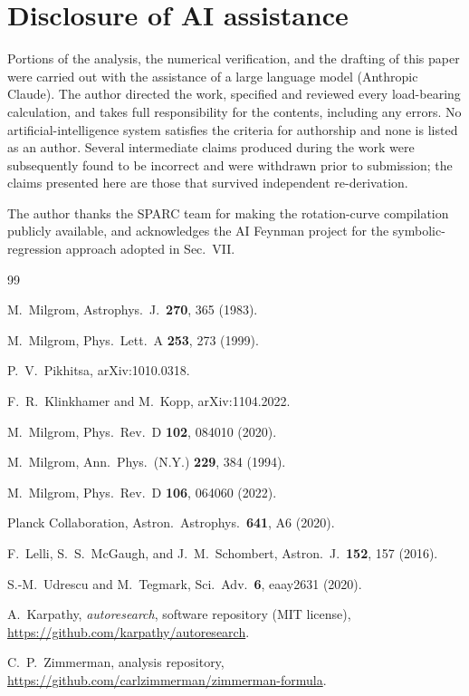 \documentclass[aps,prd,reprint,amsmath,amssymb,nofootinbib,superscriptaddress]{revtex4-2}
\begin{document}
\section*{Disclosure of AI assistance}

Portions of the analysis, the numerical verification, and the drafting of this paper were carried out
with the assistance of a large language model (Anthropic Claude). The author directed the work,
specified and reviewed every load-bearing calculation, and takes full responsibility for the contents,
including any errors. No artificial-intelligence system satisfies the criteria for authorship and none
is listed as an author. Several intermediate claims produced during the work were subsequently found to
be incorrect and were withdrawn prior to submission; the claims presented here are those that survived
independent re-derivation.

\begin{acknowledgments}
The author thanks the SPARC team for making the rotation-curve compilation publicly available, and
acknowledges the AI Feynman project for the symbolic-regression approach adopted in Sec.~VII.
\end{acknowledgments}

\begin{thebibliography}{99}

 M.~Milgrom, Astrophys.\ J.\ \textbf{270}, 365 (1983).

 M.~Milgrom, Phys.\ Lett.\ A \textbf{253}, 273 (1999).

 P.~V.~Pikhitsa, arXiv:1010.0318.

 F.~R.~Klinkhamer and M.~Kopp, arXiv:1104.2022.

 M.~Milgrom, Phys.\ Rev.\ D \textbf{102}, 084010 (2020).

 M.~Milgrom, Ann.\ Phys.\ (N.Y.) \textbf{229}, 384 (1994).

 M.~Milgrom, Phys.\ Rev.\ D \textbf{106}, 064060 (2022).

 Planck Collaboration, Astron.\ Astrophys.\ \textbf{641}, A6 (2020).

 F.~Lelli, S.~S.~McGaugh, and J.~M.~Schombert, Astron.\ J.\ \textbf{152}, 157 (2016).

 S.-M.~Udrescu and M.~Tegmark, Sci.\ Adv.\ \textbf{6}, eaay2631 (2020).

 A.~Karpathy, \emph{autoresearch}, software repository (MIT license),
  \url{https://github.com/karpathy/autoresearch}.

 C.~P.~Zimmerman, analysis repository,
  \url{https://github.com/carlzimmerman/zimmerman-formula}.

\end{thebibliography}
\end{document}
